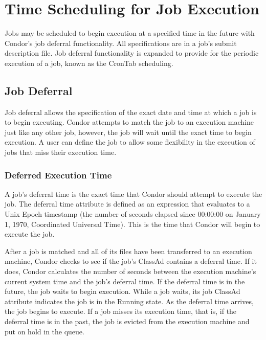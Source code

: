\section{Time Scheduling for Job Execution}
\label{sec:Job-Executetime-Scheduling}

Jobs may be scheduled to begin execution at a specified time in the future
with Condor's job deferral functionality.
All specifications are in a job's submit description file.
Job deferral functionality is expanded to provide for the
periodic execution of a job, known as the CronTab scheduling.

\subsection{Job Deferral}
\label{sec:JobDeferral}

Job deferral allows the specification of
the exact date and time at which a job is to begin executing.
Condor attempts to match the job to an execution machine
just like any other job,
however, the job will wait until the exact time to begin execution.
A user can define the job to allow some flexibility in the execution of jobs
that miss their execution time.

\subsubsection{Deferred Execution Time}
\label{sec:JobDeferral-DeferralTime}

A job's deferral time is the exact time that Condor should attempt
to execute the job.
The deferral time attribute is defined as an expression
that evaluates to a Unix Epoch timestamp
(the number of seconds elapsed since 00:00:00 on January 1, 1970,
Coordinated Universal Time).
This is the time that Condor will begin to execute the job.

After a job is matched and all of its files have been transferred
to an execution machine,
Condor checks to see if the job's ClassAd contains a deferral time.
If it does,
Condor calculates the number of seconds between the execution
machine's current system time and the job's deferral time.
If the deferral time is in the future,
the job waits to begin execution.
While a job waits,
its job ClassAd attribute  indicates the job
is in the Running state.
As the deferral time arrives, the job begins to execute.
If a job misses its execution time,
that is, if the deferral time is in the past,
the job is evicted from the execution machine and put on hold in the queue.

